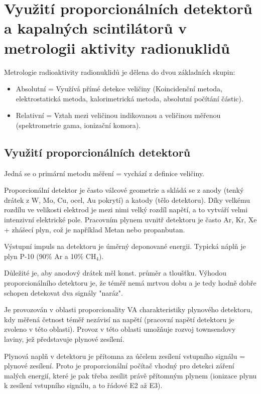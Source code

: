 \section[Využití detektorů v metrologii aktivity]{Využití proporcionálních detektorů a kapalných scintilátorů v metrologii aktivity radionuklidů}

Metrologie radioaktivity radionuklidů je dělena do dvou základních skupin:

\begin{itemize}
    \item Absolutní = Využívá přímé detekce veličiny (Koincidenční metoda, elektrostatická metoda, kalorimetrická metoda, absolutní počítání částic).
    \item Relativní = Vztah mezi veličinou indikovanou a veličinou měřenou (spektrometrie gama, ionizační komora).
\end{itemize}

\subsection{Využití proporcionálních detektorů}

Jedná se o primární metodu měření = vychází z definice veličiny.

Proporcionální detektor je často válcové geometrie a skládá se z anody (tenký drátek z W, Mo, Cu, ocel, Au pokrytí) a katody (tělo detektoru). Díky velkému rozdílu ve velikosti elektrod je mezi nimi velký rozdíl napětí, a to vytváří velmi intenzivní elektrické pole. Pracovním plynem uvnitř detektoru je často Ar, Kr, Xe + zhášecí plyn, což je například Metan nebo propanbutan.

Výstupní impuls na detektoru je úměrný deponované energii. Typická náplň je plyn P-10 (90\% Ar a 10\% CH$_4$).

Důležité je, aby anodový drátek měl konst. průměr a tloušťku. Výhodou proporcionálního detektoru je, že téměř nemá mrtvou dobu a je tedy hodně dobře schopen detekovat dva signály "naráz".

Je provozován v oblasti proporcionality VA charakteristiky plynového detektoru, kdy měřená četnost téměř nezávisí na napětí (pracovní napětí detektoru je zvoleno v této oblasti). Provoz v této oblasti umožňuje rozvoj townsendovy laviny, jež představuje plynové zesílení.

Plynová naplň v detektoru je přítomna za účelem zesílení vstupního signálu = plynové zesílení. Proto je proporcionální počítač vhodný pro detekci záření malých energií, které je pak třeba zesílit právě přítomným plynem (ionizace plynu k zesílení vstupního signálu, a to řádové E2 až E3).

